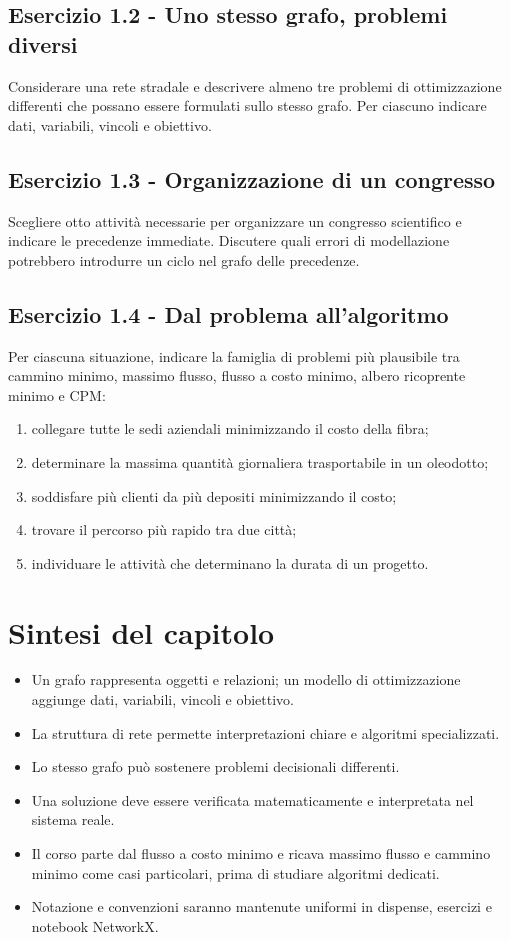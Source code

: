\documentclass[11pt,a4paper]{article}
\begin{document}
\subsection*{Esercizio 1.2 - Uno stesso grafo, problemi diversi}
Considerare una rete stradale e descrivere almeno tre problemi di ottimizzazione differenti che possano essere formulati sullo stesso grafo. Per ciascuno indicare dati, variabili, vincoli e obiettivo.

\subsection*{Esercizio 1.3 - Organizzazione di un congresso}
Scegliere otto attività necessarie per organizzare un congresso scientifico e indicare le precedenze immediate. Discutere quali errori di modellazione potrebbero introdurre un ciclo nel grafo delle precedenze.

\subsection*{Esercizio 1.4 - Dal problema all'algoritmo}
Per ciascuna situazione, indicare la famiglia di problemi più plausibile tra cammino minimo, massimo flusso, flusso a costo minimo, albero ricoprente minimo e CPM:
\begin{enumerate}[label=(\alph*)]
\item collegare tutte le sedi aziendali minimizzando il costo della fibra;
\item determinare la massima quantità giornaliera trasportabile in un oleodotto;
\item soddisfare più clienti da più depositi minimizzando il costo;
\item trovare il percorso più rapido tra due città;
\item individuare le attività che determinano la durata di un progetto.
\end{enumerate}

\section{Sintesi del capitolo}

\begin{keybox}
\begin{itemize}[nosep]
\item Un grafo rappresenta oggetti e relazioni; un modello di ottimizzazione aggiunge dati, variabili, vincoli e obiettivo.
\item La struttura di rete permette interpretazioni chiare e algoritmi specializzati.
\item Lo stesso grafo può sostenere problemi decisionali differenti.
\item Una soluzione deve essere verificata matematicamente e interpretata nel sistema reale.
\item Il corso parte dal flusso a costo minimo e ricava massimo flusso e cammino minimo come casi particolari, prima di studiare algoritmi dedicati.
\item Notazione e convenzioni saranno mantenute uniformi in dispense, esercizi e notebook NetworkX.
\end{itemize}
\end{keybox}
\end{document}
